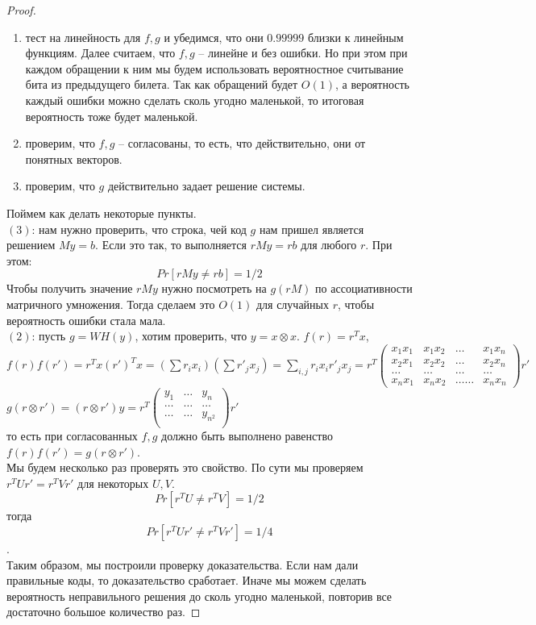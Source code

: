 \documentclass[12pt, letterpaper]{article}
\begin{document}
\begin{proof}
\begin{enumerate}
\item тест на линейность для $f,g$ и убедимся, что они $0.99999$ близки к линейным функциям.
Далее считаем, что $f,g$ -- линейне и без ошибки. Но при этом при каждом обращении к ним мы будем использовать вероятностное считывание бита из предыдущего билета. Так как обращений будет $O(1)$, а вероятность каждый ошибки можно сделать сколь угодно маленькой, то итоговая вероятность тоже будет маленькой.
\item проверим, что $f,g$ -- согласованы, то есть, что действительно, они от понятных векторов.
\item проверим, что $g$ действительно задает решение системы.
\end{enumerate}
Поймем как делать некоторые пункты.\\
$(3)$: нам нужно проверить, что строка, чей код $g$ нам пришел является решением $My=b$. Если это так, то выполняется $rMy = rb$ для любого $r$. При этом:
$$
Pr[rMy \neq rb] = 1/2
$$
Чтобы получить значение $rMy$ нужно посмотреть на $g(rM)$ по ассоциативности матричного умножения. Тогда сделаем это $O(1)$ для случайных $r$, чтобы вероятность ошибки стала мала.\\
$(2)$: пусть $g=WH(y)$, хотим проверить, что $y=x\otimes x$. $f(r) = r^T x$, $f(r) f(r') = r^T x (r')^T x = (\sum r_i x_i)(\sum r'_j x_j) = \sum_{i,j} r_i x_i r'_j x_j = r^T \begin{pmatrix}
x_1 x_1 & x_1 x_2 & \ldots & x_1 x_n \\
x_2 x_1 & x_2 x_2 & \ldots & x_2 x_n \\
\ldots & \ldots & \ldots & \ldots \\ 
x_n x_1 & x_n x_2 & \ldots \ldots & x_n x_n
\end{pmatrix}r'$\\
$g(r \otimes r') = (r \otimes r') y = r^T \begin{pmatrix}
y_1 & \ldots & y_n \\
\ldots & \ldots & \ldots \\
\ldots & \ldots & y_{n^2}\\
\end{pmatrix} r' $\\ то есть при согласованных $f, g$ должно быть выполнено равенство $f(r)f(r') = g(r \otimes r')$. \\
Мы будем несколько раз проверять это свойство. По сути мы проверяем $r^T U r' = r^T V r'$ для некоторых $U, V$. $$Pr[r^T U \neq r^T V] = 1/2 $$ тогда $$Pr[r^T U r' \neq r^T V r'] =1/4$$.\\
Таким образом, мы построили проверку доказательства. Если нам дали правильные коды, то доказательство сработает. Иначе мы можем сделать вероятность неправильного решения до сколь угодно маленькой, повторив все достаточно большое количество раз.
\end{proof}
\end{document}
